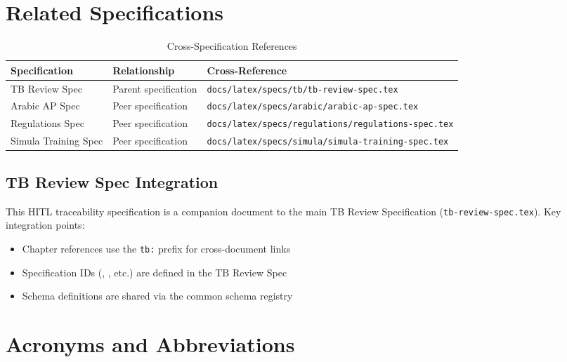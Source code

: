 \section{Related Specifications}
\label{sec:related-specs}

\begin{table}[h]
\centering
\caption{Cross-Specification References}
\label{tab:cross-spec-refs}
\begin{tabularx}{\textwidth}{@{}L{4.5cm}L{4cm}L{5cm}@{}}
\toprule
\textbf{Specification} & \textbf{Relationship} & \textbf{Cross-Reference} \\
\midrule
TB Review Spec & Parent specification & \texttt{docs/latex/specs/tb/tb-review-spec.tex} \\
Arabic AP Spec & Peer specification & \texttt{docs/latex/specs/arabic/arabic-ap-spec.tex} \\
Regulations Spec & Peer specification & \texttt{docs/latex/specs/regulations/regulations-spec.tex} \\
Simula Training Spec & Peer specification & \texttt{docs/latex/specs/simula/simula-training-spec.tex} \\
\bottomrule
\end{tabularx}
\end{table}

\subsection{TB Review Spec Integration}

This HITL traceability specification is a companion document to the
main TB Review Specification (\texttt{tb-review-spec.tex}). Key
integration points:

\begin{itemize}[noitemsep]
  \item Chapter references use the \texttt{tb:} prefix for cross-document links
  \item Specification IDs (, , etc.) are
        defined in the TB Review Spec
  \item Schema definitions are shared via the common schema registry
\end{itemize}

\section{Acronyms and Abbreviations}
\label{sec:acronyms}

